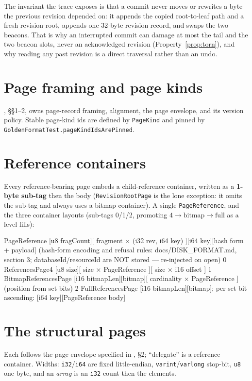 \documentclass[11pt,a4paper,oneside]{report}
\theoremstyle{sirixthm}
\newcommand{\code}[1]{\texttt{#1}}
\begin{document}
\noindent The invariant the trace exposes is that a commit never moves or rewrites a byte the previous
revision depended on: it appends the copied root-to-leaf path and a fresh revision-root, appends one
32-byte revision record, and swaps the two beacons. That is why an interrupted commit can damage at most
the tail and the two beacon slots, never an acknowledged revision (Property~\ref{prop:torn}), and why
reading any past revision is a direct traversal rather than an undo.

\section{Page framing and page kinds}

, \S\S1--2, owns page-record framing, alignment, the page envelope,
and its version policy. Stable page-kind ids are defined by \code{PageKind} and pinned by
\code{GoldenFormatTest.pageKindIdsArePinned}.

\section{Reference containers}

Every reference-bearing page embeds a child-reference container, written as a \textbf{1-byte sub-tag}
then the body (\code{RevisionRootPage} is the lone exception: it omits the sub-tag and always uses a
bitmap container). A single \code{PageReference}, and the three container layouts (sub-tags 0/1/2,
promoting $4 \to \text{bitmap} \to \text{full}$ as a level fills):

\begin{diagramS}
PageReference   [u8 fragCount][ fragment × (i32 rev, i64 key) ][i64 key][hash form + payload]
   (hash-form encoding and refusal rules: docs/DISK_FORMAT.md, section 3;
    databaseId/resourceId are NOT stored — re-injected on open)
0 ReferencesPage4       [u8 size][ size × PageReference ][ size × i16 offset ]
1 BitmapReferencesPage  [i16 bitmapLen][bitmap][ cardinality × PageReference ]   (position from set bits)
2 FullReferencesPage    [i16 bitmapLen][bitmap]; per set bit ascending: [i64 key][PageReference body]
\end{diagramS}

\section{The structural pages}

Each follows the page envelope specified in , \S2;
``delegate'' is a reference container. Widths:
\code{i32}/\code{i64} are fixed little-endian, \code{varint}/\code{varlong} stop-bit, \code{u8} one byte,
and an \emph{array} is an \code{i32} count then the elements.
\end{document}
